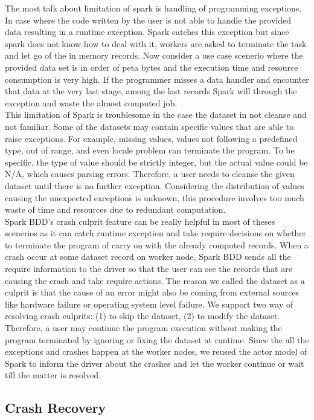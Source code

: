 \documentclass{acm_proc_article-sp}
\begin{document}
The most talk about limitation of spark is handling of programming exceptions. In case where the code written by the user is not able to handle the provided data resulting in a runtime exception. Spark catches this exception but since spark does not know how to deal with it, workers are asked to terminate the task and let go of the in memory records. Now consider a use case scenerio where the provided data set is in order of peta bytes and the execution time and resource consumption is very high. If the programmer misses a data handler and encounter that data at the very last stage, among the last records Spark will through the exception and waste the almost computed job.\\
This limitation of Spark is troublesome in the case the dataset in not cleanse and not familiar. Some of the datasets may contain specific values that are able to raise exceptions. For example, missing values, values not following a predefined type, out of range, and even locale problem can terminate the program. To be specific, the type of value should be strictly integer, but the actual value could be N/A, which causes parsing errors. Therefore, a user needs to cleanse the given dataset until there is no further exception. Considering the distribution of values causing the unexpected exceptions is unknown, this procedure involves too much waste of time and resources due to redundant computation.\\
Spark BDD's crash culprit feature can be really helpful in most of theses scenerios as it can catch runtime exception and take require decisions on whether to terminate the program of carry on with the already computed records. When a crash occur at some dataset record on worker node, Spark BDD sends all the require information to the driver so that the user can see the records that are causing the crash and take require actions. The reason we called the dataset as a culprit is that the cause of an error might also be coming from external sources like hardware failure or operating system level failure. We support two way of resolving crash culprits: (1) to skip the dataset, (2) to modify the dataset. Therefore, a user may continue the program execution without making the program terminated by ignoring or fixing the dataset at runtime. Since the all the exceptions and crashes happen at the worker nodes, we reused the actor model of Spark to inform the driver about the crashes and let the worker continue or wait till the matter is resolved. 

\subsection{Crash Recovery}
\end{document}
